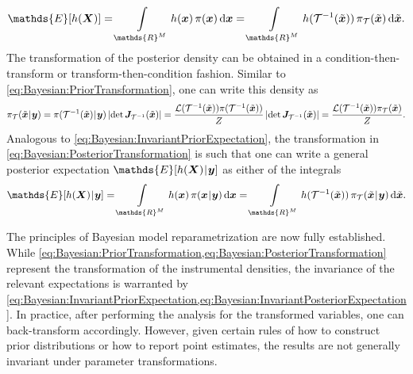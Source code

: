 \begin{equation} \label{eq:Bayesian:InvariantPriorExpectation}
  \mathds{E}[h(\bm{X})]
  = \int\limits_{\mathds{R}^\dimParam} h(\bm{x}) \, \pi(\bm{x}) \, \mathrm{d} \bm{x}
  = \int\limits_{\mathds{R}^\dimParam} h(\mathcal{T}^{-1}(\tilde{\bm{x}})) \, \pi_{\mathcal{T}}(\tilde{\bm{x}}) \, \mathrm{d} \tilde{\bm{x}}.
\end{equation}
The transformation of the posterior density can be obtained in a condition-then-transform or transform-then-condition fashion.
Similar to \cref{eq:Bayesian:PriorTransformation}, one can write this density as
\begin{equation} \label{eq:Bayesian:PosteriorTransformation}
  \pi_{\mathcal{T}}(\tilde{\bm{x}} {\:\!}|{\:\!} \bm{y})
  = \pi(\mathcal{T}^{-1}(\tilde{\bm{x}}) {\:\!}|{\:\!} \bm{y}) \, \lvert \det \bm{J}_{\mathcal{T}^{-1}}(\tilde{\bm{x}}) \rvert
  = \frac{\mathcal{L}(\mathcal{T}^{-1}(\tilde{\bm{x}})) \pi(\mathcal{T}^{-1}(\tilde{\bm{x}}))}{Z} \, \lvert \det \bm{J}_{\mathcal{T}^{-1}}(\tilde{\bm{x}}) \rvert
  = \frac{\mathcal{L}(\mathcal{T}^{-1}(\tilde{\bm{x}})) \pi_{\mathcal{T}}(\tilde{\bm{x}})}{Z}.
\end{equation}
Analogous to \cref{eq:Bayesian:InvariantPriorExpectation}, the transformation in \cref{eq:Bayesian:PosteriorTransformation} is such that
one can write a general posterior expectation \(\mathds{E}[h(\bm{X}) \cond \bm{y}]\) as either of the integrals
\begin{equation} \label{eq:Bayesian:InvariantPosteriorExpectation}
  \mathds{E}[h(\bm{X}) \cond \bm{y}]
  = \int\limits_{\mathds{R}^\dimParam} h(\bm{x}) \, \pi(\bm{x} \cond \bm{y}) \, \mathrm{d} \bm{x}
  = \int\limits_{\mathds{R}^\dimParam} h(\mathcal{T}^{-1}(\tilde{\bm{x}})) \, \pi_{\mathcal{T}}(\tilde{\bm{x}} \cond \bm{y}) \, \mathrm{d} \tilde{\bm{x}}.
\end{equation}
\par %
The principles of Bayesian model reparametrization are now fully established.
While \cref{eq:Bayesian:PriorTransformation,eq:Bayesian:PosteriorTransformation} represent the transformation of the instrumental densities,
the invariance of the relevant expectations is warranted by \cref{eq:Bayesian:InvariantPriorExpectation,eq:Bayesian:InvariantPosteriorExpectation}.
In practice, after performing the analysis for the transformed variables, one can back-transform accordingly.
However, given certain rules of how to construct prior distributions or how to report point estimates,
the results are not generally invariant under parameter transformations.

